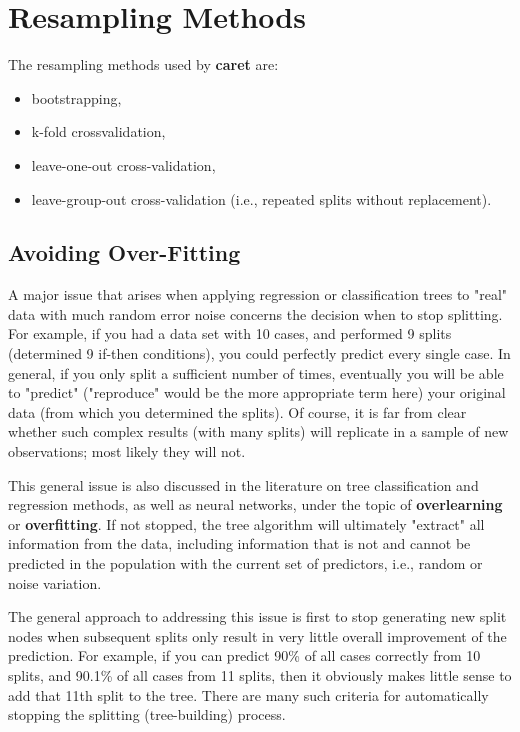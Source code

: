 \documentclass[caret-main.tex]{subfiles}
\begin{document}
\section{Resampling Methods}
The resampling methods used by \textbf{caret} are:
\begin{itemize}
\item bootstrapping, 
\item k-fold crossvalidation,
\item leave-one-out cross-validation,
\item  leave-group-out cross-validation (i.e., repeated
splits without replacement).
\end{itemize}

\subsection{Avoiding Over-Fitting}

A major issue that arises when applying regression or classification trees to "real" data with much random error noise concerns the decision when to stop splitting. For example, if you had a data set with 10 cases, and performed 9 splits (determined 9 if-then conditions), you could perfectly predict every single case. In general, if you only split a sufficient number of times, eventually you will be able to "predict" ("reproduce" would be the more appropriate term here) your original data (from which you determined the splits). Of course, it is far from clear whether such complex results (with many splits) will replicate in a sample of new observations; most likely they will not.

This general issue is also discussed in the literature on tree classification and regression methods, as well as neural networks, under the topic of \textbf{overlearning} or \textbf{overfitting}.
 If not stopped, the tree algorithm will ultimately "extract" all information from the data, including information that is not and cannot be predicted in the population with the current set of predictors, i.e., random or noise variation. 

The general approach to addressing this issue is first to stop generating new split nodes when subsequent splits only result in very little overall improvement of the prediction. For example, if you can predict 90\% of all cases correctly from 10 splits, and 90.1\% of all cases from 11 splits, then it obviously makes little sense to add that 11th split to the tree. There are many such criteria for automatically stopping the splitting (tree-building) process.
\end{document}
